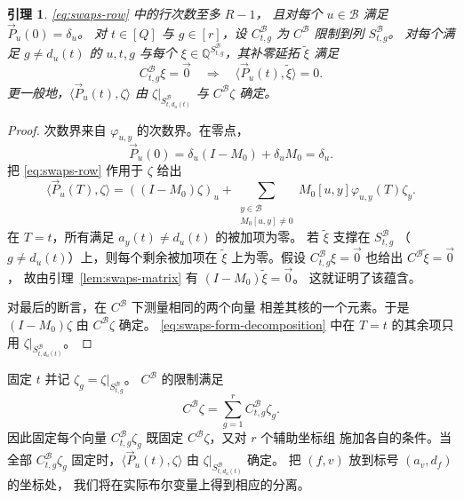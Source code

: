 \documentclass[11pt,reqno]{amsart}
\numberwithin{equation}{section}
\newtheorem{lemma}[theorem]{引理}
\theoremstyle{definition}\newtheorem{definition}[theorem]{定义}
\theoremstyle{remark}\newtheorem{remark}[theorem]{注}
\begin{document}
\begin{lemma}\label{lem:swaps-forms}
\eqref{eq:swaps-row} 中的行次数至多 $R-1$，
且对每个 $u\in\mathcal B$ 满足 $\vec{P}_u(0)=\delta_u$。
对 $t\in[Q]$ 与 $g\in[r]$，设 $C^{\mathcal B}_{t,g}$
为 $C^{\mathcal B}$ 限制到列 $S^{\mathcal B}_{t,g}$。
对每个满足 $g\ne d_u(t)$ 的 $u,t,g$ 与每个
$\xi\in\mathbb Q^{S^{\mathcal B}_{t,g}}$，其补零延拓
$\widetilde\xi$ 满足
\[
 C^{\mathcal B}_{t,g}\xi=\vec{0}
 \quad\Longrightarrow\quad \langle \vec{P}_u(t), \widetilde\xi\rangle=0.
\]
更一般地，$\langle \vec{P}_u(t), \zeta\rangle$
由 $\zeta|_{S^{\mathcal B}_{t,d_u(t)}}$ 与
$C^{\mathcal B}\zeta$ 确定。
\end{lemma}
\begin{proof}
次数界来自 $\varphi_{u,y}$ 的次数界。在零点，
\[
 \vec{P}_u(0)=\delta_u(I-M_0)+\delta_uM_0=\delta_u.
\]
把 \eqref{eq:swaps-row} 作用于 $\zeta$ 给出
\begin{equation}\label{eq:swaps-form-decomposition}
 \langle \vec{P}_u(T), \zeta\rangle=((I-M_0)\zeta)_u+
 \sum_{\substack{y\in\mathcal B\\M_0[u,y]\ne0}}
 M_0[u,y]\varphi_{u,y}(T)\zeta_y.
\end{equation}
在 $T=t$，所有满足 $a_y(t)\ne d_u(t)$ 的被加项为零。
若 $\widetilde\xi$ 支撑在 $S^{\mathcal B}_{t,g}$
（$g\ne d_u(t)$）上，则每个剩余被加项在 $\widetilde\xi$
上为零。假设 $C^{\mathcal B}_{t,g}\xi=\vec{0}$
也给出 $C^{\mathcal B}\widetilde\xi=\vec{0}$，
故由引理~\ref{lem:swaps-matrix} 有
$(I-M_0)\widetilde\xi=\vec{0}$。
这就证明了该蕴含。

对最后的断言，在 $C^{\mathcal B}$ 下测量相同的两个向量
相差其核的一个元素。于是 $(I-M_0)\zeta$
由 $C^{\mathcal B}\zeta$ 确定。
\eqref{eq:swaps-form-decomposition} 中在 $T=t$
的其余项只用 $\zeta|_{S^{\mathcal B}_{t,d_u(t)}}$。
\end{proof}

固定 $t$ 并记 $\zeta_g=\zeta|_{S^{\mathcal B}_{t,g}}$。
$C^{\mathcal B}$ 的限制满足
\begin{equation}\label{eq:auxiliary-measurements}
 C^{\mathcal B}\zeta=\sum_{g=1}^r C^{\mathcal B}_{t,g}\zeta_g.
\end{equation}
因此固定每个向量 $C^{\mathcal B}_{t,g}\zeta_g$
既固定 $C^{\mathcal B}\zeta$，又对 $r$ 个辅助坐标组
施加各自的条件。当全部 $C^{\mathcal B}_{t,g}\zeta_g$
固定时，$\langle \vec{P}_u(t), \zeta\rangle$
由 $\zeta|_{S^{\mathcal B}_{t,d_u(t)}}$ 确定。
把 $(f,v)$ 放到标号 $(a_v,d_f)$ 的坐标处，
我们将在实际布尔变量上得到相应的分离。
\end{document}

